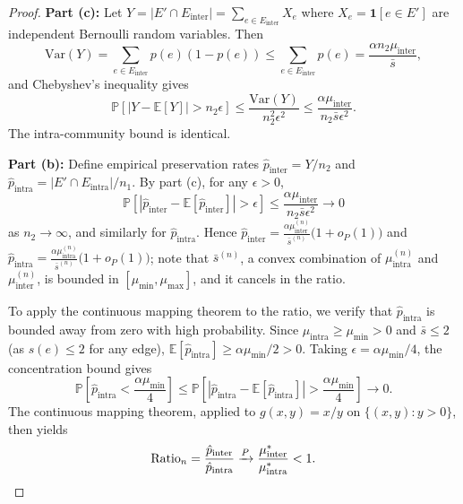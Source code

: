 \documentclass[10pt,journal,compsoc]{IEEEtran}
\begin{document}
\begin{proof}
\textbf{Part (c):} Let $Y = |E' \cap E_{\text{inter}}| = \sum_{e \in E_{\text{inter}}} X_e$ where $X_e = \mathbf{1}[e \in E']$ are independent Bernoulli random variables.
Then
\begin{equation}
\text{Var}(Y) = \sum_{e \in E_{\text{inter}}} p(e)(1 - p(e)) \leq \sum_{e \in E_{\text{inter}}} p(e) = \frac{\alpha n_2 \mu_{\text{inter}}}{\bar{s}},
\end{equation}
and Chebyshev's inequality gives
\begin{equation}
\mathbb{P}[|Y - \mathbb{E}[Y]| > n_2 \epsilon] \leq \frac{\text{Var}(Y)}{n_2^2 \epsilon^2} \leq \frac{\alpha \mu_{\text{inter}}}{n_2 \bar{s} \epsilon^2}.
\end{equation}
The intra-community bound is identical.

\textbf{Part (b):} Define empirical preservation rates $\hat{p}_{\text{inter}} = Y/n_2$ and $\hat{p}_{\text{intra}} = |E' \cap E_{\text{intra}}|/n_1$.
By part (c), for any $\epsilon > 0$,
\begin{equation}
\mathbb{P}\left[|\hat{p}_{\text{inter}} - \mathbb{E}[\hat{p}_{\text{inter}}]| > \epsilon\right] \leq \frac{\alpha \mu_{\text{inter}}}{n_2 \bar{s} \epsilon^2} \to 0
\end{equation}
as $n_2 \to \infty$, and similarly for $\hat{p}_{\text{intra}}$.
Hence $\hat{p}_{\text{inter}} = \frac{\alpha \mu_{\text{inter}}^{(n)}}{\bar{s}^{(n)}}\bigl(1 + o_P(1)\bigr)$ and $\hat{p}_{\text{intra}} = \frac{\alpha \mu_{\text{intra}}^{(n)}}{\bar{s}^{(n)}}\bigl(1 + o_P(1)\bigr)$; note that $\bar{s}^{(n)}$, a convex combination of $\mu_{\text{intra}}^{(n)}$ and $\mu_{\text{inter}}^{(n)}$, is bounded in $[\mu_{\min}, \mu_{\max}]$, and it cancels in the ratio.

To apply the continuous mapping theorem to the ratio, we verify that $\hat{p}_{\text{intra}}$ is bounded away from zero with high probability.
Since $\mu_{\text{intra}} \geq \mu_{\min} > 0$ and $\bar{s} \leq 2$ (as $s(e) \leq 2$ for any edge), $\mathbb{E}[\hat{p}_{\text{intra}}] \geq \alpha \mu_{\min}/2 > 0$.
Taking $\epsilon = \alpha \mu_{\min}/4$, the concentration bound gives
\begin{equation}
\mathbb{P}\left[\hat{p}_{\text{intra}} < \frac{\alpha \mu_{\min}}{4}\right] \leq \mathbb{P}\left[|\hat{p}_{\text{intra}} - \mathbb{E}[\hat{p}_{\text{intra}}]| > \frac{\alpha \mu_{\min}}{4}\right] \to 0.
\end{equation}
The continuous mapping theorem, applied to $g(x,y) = x/y$ on $\{(x,y) : y > 0\}$, then yields
\begin{equation}
\text{Ratio}_n = \frac{\hat{p}_{\text{inter}}}{\hat{p}_{\text{intra}}} \xrightarrow{P} \frac{\mu_{\text{inter}}^*}{\mu_{\text{intra}}^*} < 1. \qedhere
\end{equation}
\end{proof}
\end{document}

